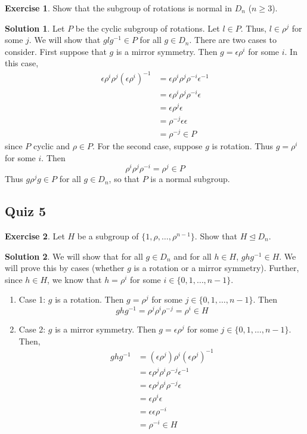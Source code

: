\documentclass[12pt]{article}
\theoremstyle{definition}
\newcommand{\e}{\epsilon}
\newtheorem{exercise}{\color{YellowOrange}Exercise}
\theoremstyle{definition}
\newtheorem{solution}{\color{Goldenrod}Solution}
\begin{document}
\begin{exercise}
	Show that the subgroup of rotations is normal in $D_n$ ($n \geq 3$).
\end{exercise}
\begin{solution}
	Let $P$ be the cyclic subgroup of rotations. Let $l \in P$. Thus, $l \in \rho^j$ for some $j$. We will show that $glg^{-1} \in P$ for all $g \in D_n$. There are two cases to consider. First suppose that $g$ is a mirror symmetry. Then $g = \e \rho^i$ for some $i$. In this case,
	\begin{align*}
		\e \rho^i \rho^j (\e \rho^i)^{-1} &= \e \rho^i \rho^j \rho^{-i}\e^{-1} \\
		&= \e \rho^i \rho^j \rho^{-i}\e \\
		&= \e \rho^j \e \\
		&= \rho^{-j} \e \e \\
		&= \rho^{-j} \in P
	\end{align*}
	since $P$ cyclic and $\rho \in P$. For the second case, suppose $g$ is rotation. Thus $g = \rho^i$ for some $i$. Then
	\begin{equation}
		\rho^i \rho^j \rho^{-i} = \rho^j \in P
	\end{equation}
	Thus $g\rho^jg \in P$ for all $g \in D_n$, so that $P$ is a normal subgroup. 
\end{solution}

\subsection{Quiz 5}
\begin{exercise}
	Let $H$ be a subgroup of $\{1, \rho, \ldots, \rho^{n-1}\}$. Show that $H \trianglelefteq D_n$. 
\end{exercise}
\begin{solution}
	We will show that for all $g \in D_n$ and for all $h \in H$, $ghg^{-1} \in H$. We will prove this by cases (whether $g$ is a rotation or a mirror symmetry). Further, since $h \in H$, we know that $h = \rho^{i}$ for some $i \in \{0,1,\ldots, n-1\}$. 
	\begin{enumerate}
		\item Case 1: $g$ is a rotation. Then $g = \rho^j$ for some $j \in \{0,1,\ldots, n-1\}$. Then
		\begin{equation}
			ghg^{-1} = \rho^j \rho^i \rho^{-j} = \rho^i \in H
		\end{equation}
		\item Case 2: $g$ is a mirror symmetry. Then $g = \e \rho^j$ for some $j \in \{0,1,\ldots, n-1\}$. Then,
		\begin{align*}
			ghg^{-1} &= (\e \rho^j)\rho^i(\e \rho^j)^{-1} \\
			&= \e \rho^j \rho^i \rho^{-j} \e^{-1} \\
			&= \e \rho^j \rho^i \rho^{-j} \e \\
			&= \e \rho^i \e \\
			&= \e \e \rho^{-i} \\
			&= \rho^{-i} \in H \tag{since $H$ is a subgroup, contains inverses}
		\end{align*}
	\end{enumerate}
\end{solution}
\end{document}
